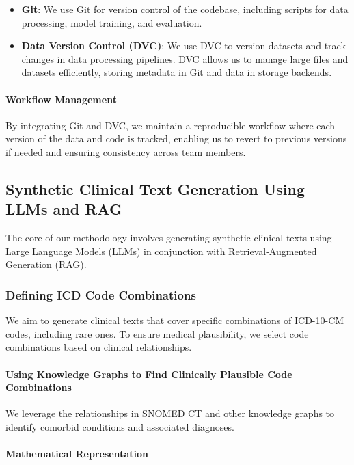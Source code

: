 \documentclass[12pt, a4paper]{article}
\begin{document}
\begin{itemize}
    \item \textbf{Git}: We use Git for version control of the codebase, including scripts for data processing, model training, and evaluation.
    \item \textbf{Data Version Control (DVC)}: We use DVC to version datasets and track changes in data processing pipelines. DVC allows us to manage large files and datasets efficiently, storing metadata in Git and data in storage backends.
\end{itemize}

\paragraph{Workflow Management}

By integrating Git and DVC, we maintain a reproducible workflow where each version of the data and code is tracked, enabling us to revert to previous versions if needed and ensuring consistency across team members.

\subsection{Synthetic Clinical Text Generation Using LLMs and RAG}

The core of our methodology involves generating synthetic clinical texts using Large Language Models (LLMs) in conjunction with Retrieval-Augmented Generation (RAG).

\subsubsection{Defining ICD Code Combinations}

We aim to generate clinical texts that cover specific combinations of ICD-10-CM codes, including rare ones. To ensure medical plausibility, we select code combinations based on clinical relationships.

\paragraph{Using Knowledge Graphs to Find Clinically Plausible Code Combinations}

We leverage the relationships in SNOMED CT and other knowledge graphs to identify comorbid conditions and associated diagnoses.

\paragraph{Mathematical Representation}
\end{document}
